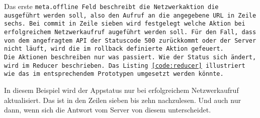 %
Das erste \tt{meta.offline} Feld beschreibt die Netzwerkaktion die ausgeführt werden soll, also den Aufruf an die angegebene URL in Zeile sechs.
Bei \tt{commit} in Zeile sieben wird festgelegt welche Aktion bei erfolgreichem Netzwerkaufruf augeführt werden soll.
Für den Fall, dass von dem angefragtem \gls{API} der Statuscode 500 zurückkommt oder der Server nicht läuft, wird die im \tt{rollback} definierte Aktion gefeuert.\\
Die Aktionen beschreiben nur was passiert. Wie der Status sich ändert, wird im \tt{Reducer} beschrieben.
Das Listing \ref{code:reducer} illustriert wie das im entsprechendem Prototypen umgesetzt werden könnte.
%
\begin{center}
  
\end{center}
%
In diesem Beispiel wird der Appstatus nur bei erfolgreichem Netzwerkaufruf aktualisiert. Das ist in den Zeilen sieben bis zehn nachzulesen. Und auch nur dann, wenn sich die Antwort vom Server von diesem unterscheidet.